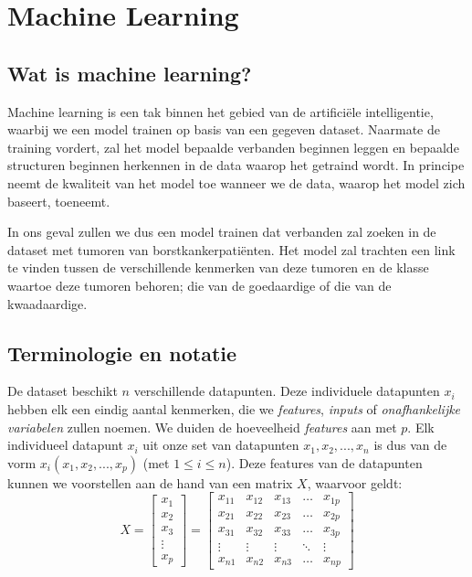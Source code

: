 \documentclass[TeamE-eindrapport]{subfiles}
\begin{document}
	
	\chapter{Machine Learning}
	
	\section{Wat is machine learning?}
	
	Machine learning is een tak binnen het gebied van de artificiële intelligentie, waarbij we een model trainen op basis van een gegeven dataset. Naarmate de training vordert, zal het model bepaalde verbanden beginnen leggen en bepaalde structuren beginnen herkennen in de data waarop het getraind wordt. In principe neemt de kwaliteit van het model toe wanneer we de data, waarop het model zich baseert, toeneemt.
	
	In ons geval zullen we dus een model trainen dat verbanden zal zoeken in de dataset met tumoren van borstkankerpatiënten. Het model zal trachten een link te vinden tussen de verschillende kenmerken van deze tumoren en de klasse waartoe deze tumoren behoren; die van de goedaardige of die van de kwaadaardige.
	
	\section{Terminologie en notatie}
	
	De dataset beschikt \(n\) verschillende datapunten. Deze individuele datapunten \(x_i\) hebben elk een eindig aantal kenmerken, die we \textit{features}, \textit{inputs} of \textit{onafhankelijke variabelen} zullen noemen. We duiden de hoeveelheid \textit{features} aan met \(p\). Elk individueel datapunt \(x_i\) uit onze set van datapunten \(x_1,x_2,...,x_n\) is dus van de vorm \(x_i(x_1,x_2,...,x_p)\) (met \( 1 \leq i \leq n \)). Deze features van de datapunten kunnen we voorstellen aan de hand van een matrix \(X\), waarvoor geldt: \[X = \left[ 
	\begin{array}{c}
		x_1 \\
		x_2 \\
		x_3 \\
		\vdots \\
		x_p
	\end{array} \right] = \left[ 
	\begin{array}{ccccc}
		x_{11} & x_{12} & x_{13} & \ldots & x_{1p}  \\
		x_{21} & x_{22} & x_{23} & \ldots & x_{2p} \\
		x_{31} & x_{32} & x_{33} & \ldots & x_{3p} \\
		\vdots & \vdots & \vdots & \ddots & \vdots \\
		x_{n1} & x_{n2} & x_{n3} & \ldots & x_{np}
	\end{array}\right]\]
	
\end{document}
